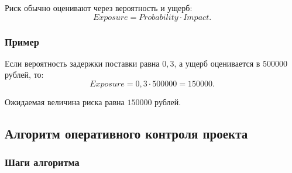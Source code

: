 \documentclass[12pt,a4paper]{article}
\begin{document}
Риск обычно оценивают через вероятность и ущерб:
\[
Exposure = Probability \cdot Impact.
\]

\subsubsection*{Пример}

Если вероятность задержки поставки равна $0{,}3$, а ущерб оценивается в $500000$ рублей, то:
\[
Exposure = 0{,}3 \cdot 500000 = 150000.
\]

Ожидаемая величина риска равна $150000$ рублей.

\subsection{Алгоритм оперативного контроля проекта}

\subsubsection*{Шаги алгоритма}
\end{document}
